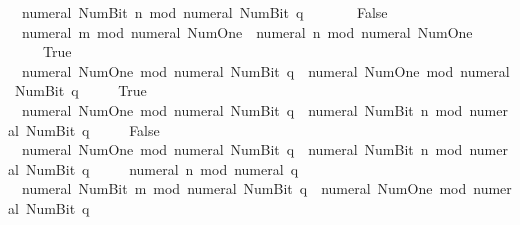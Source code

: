\begin{isabellebody}
\ \ {\isachardoublequoteopen}numeral\ {\isacharparenleft}{\kern0pt}Num{\isachardot}{\kern0pt}Bit{}\ n{\isacharparenright}{\kern0pt}\ mod\ numeral\ {\isacharparenleft}{\kern0pt}Num{\isachardot}{\kern0pt}Bit{}\ q{\isacharparenright}{\kern0pt}\ {\isacharequal}{\kern0pt}\ {}\isanewline
\ \ \ \ {\isasymlongleftrightarrow}\ False{\isachardoublequoteclose}\isanewline
\ \ {\isachardoublequoteopen}numeral\ m\ mod\ numeral\ Num{\isachardot}{\kern0pt}One\ {\isacharequal}{\kern0pt}\ {\isacharparenleft}{\kern0pt}numeral\ n\ mod\ numeral\ Num{\isachardot}{\kern0pt}One{\isacharparenright}{\kern0pt}\isanewline
\ \ \ \ {\isasymlongleftrightarrow}\ True{\isachardoublequoteclose}\isanewline
\ \ {\isachardoublequoteopen}numeral\ Num{\isachardot}{\kern0pt}One\ mod\ numeral\ {\isacharparenleft}{\kern0pt}Num{\isachardot}{\kern0pt}Bit{}\ q{\isacharparenright}{\kern0pt}\ {\isacharequal}{\kern0pt}\ {\isacharparenleft}{\kern0pt}numeral\ Num{\isachardot}{\kern0pt}One\ mod\ numeral\ {\isacharparenleft}{\kern0pt}Num{\isachardot}{\kern0pt}Bit{}\ q{\isacharparenright}{\kern0pt}{\isacharparenright}{\kern0pt}\isanewline
\ \ \ \ {\isasymlongleftrightarrow}\ True{\isachardoublequoteclose}\isanewline
\ \ {\isachardoublequoteopen}numeral\ Num{\isachardot}{\kern0pt}One\ mod\ numeral\ {\isacharparenleft}{\kern0pt}Num{\isachardot}{\kern0pt}Bit{}\ q{\isacharparenright}{\kern0pt}\ {\isacharequal}{\kern0pt}\ {\isacharparenleft}{\kern0pt}numeral\ {\isacharparenleft}{\kern0pt}Num{\isachardot}{\kern0pt}Bit{}\ n{\isacharparenright}{\kern0pt}\ mod\ numeral\ {\isacharparenleft}{\kern0pt}Num{\isachardot}{\kern0pt}Bit{}\ q{\isacharparenright}{\kern0pt}{\isacharparenright}{\kern0pt}\isanewline
\ \ \ \ {\isasymlongleftrightarrow}\ False{\isachardoublequoteclose}\isanewline
\ \ {\isachardoublequoteopen}numeral\ Num{\isachardot}{\kern0pt}One\ mod\ numeral\ {\isacharparenleft}{\kern0pt}Num{\isachardot}{\kern0pt}Bit{}\ q{\isacharparenright}{\kern0pt}\ {\isacharequal}{\kern0pt}\ {\isacharparenleft}{\kern0pt}numeral\ {\isacharparenleft}{\kern0pt}Num{\isachardot}{\kern0pt}Bit{}\ n{\isacharparenright}{\kern0pt}\ mod\ numeral\ {\isacharparenleft}{\kern0pt}Num{\isachardot}{\kern0pt}Bit{}\ q{\isacharparenright}{\kern0pt}{\isacharparenright}{\kern0pt}\isanewline
\ \ \ \ {\isasymlongleftrightarrow}\ {\isacharparenleft}{\kern0pt}numeral\ n\ mod\ numeral\ q{\isacharparenright}{\kern0pt}\ {\isacharequal}{\kern0pt}\ {}{\isachardoublequoteclose}\isanewline
\ \ {\isachardoublequoteopen}numeral\ {\isacharparenleft}{\kern0pt}Num{\isachardot}{\kern0pt}Bit{}\ m{\isacharparenright}{\kern0pt}\ mod\ numeral\ {\isacharparenleft}{\kern0pt}Num{\isachardot}{\kern0pt}Bit{}\ q{\isacharparenright}{\kern0pt}\ {\isacharequal}{\kern0pt}\ {\isacharparenleft}{\kern0pt}numeral\ Num{\isachardot}{\kern0pt}One\ mod\ numeral\ {\isacharparenleft}{\kern0pt}Num{\isachardot}{\kern0pt}Bit{}\ q{\isacharparenright}{\kern0pt}{\isacharparenright}{\kern0pt}\isanewline

\end{isabellebody}

